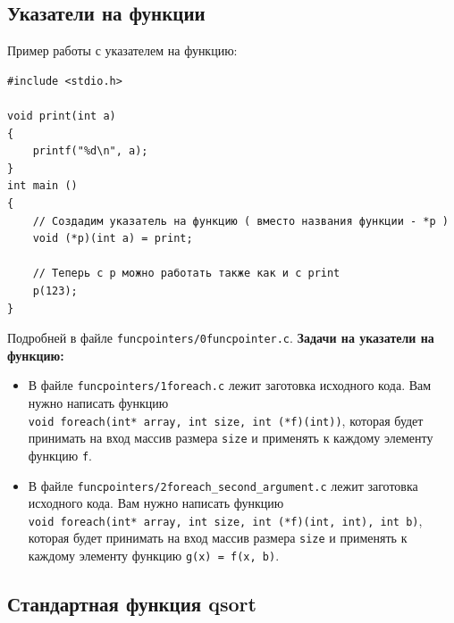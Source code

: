 \documentclass[10pt]{article}
\begin{document}
\subsection*{Указатели на функции}
Пример работы с указателем на функцию:
\begin{lstlisting}
#include <stdio.h>

void print(int a)
{
    printf("%d\n", a);
}
int main ()
{
    // Создадим указатель на функцию ( вместо названия функции - *p )
    void (*p)(int a) = print;
    
    // Теперь с p можно работать также как и с print
    p(123);
}
\end{lstlisting}
Подробней в файле \texttt{funcpointers/0funcpointer.c}.
\textbf{Задачи на указатели на функцию:}
\begin{itemize}
\item В файле \texttt{funcpointers/1foreach.c} лежит заготовка исходного кода. Вам нужно написать функцию\\ \texttt{void foreach(int* array, int size, int (*f)(int))}, которая будет принимать на вход массив размера \texttt{size} и применять к каждому элементу функцию \texttt{f}.

\item В файле \texttt{funcpointers/2foreach\_second\_argument.c} лежит заготовка исходного кода. Вам нужно написать функцию\\ \texttt{void foreach(int* array, int size, int (*f)(int, int), int b)}, которая будет принимать на вход массив размера \texttt{size} и применять к каждому элементу функцию \texttt{g(x) = f(x, b)}.
\end{itemize}


\subsection*{Стандартная функция qsort}
\end{document}
